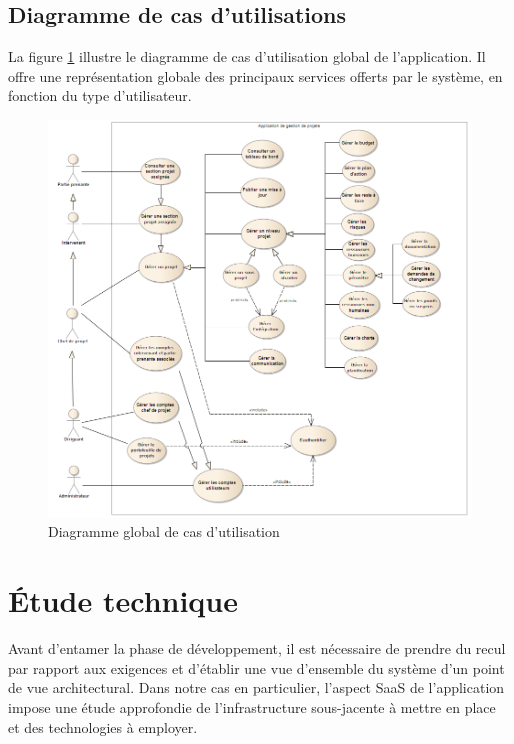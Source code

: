 \begin{spacing}{1.5}
\subsection{Diagramme de cas d'utilisations}
La figure \ref{fig:useCasesDiag} illustre le diagramme de cas d'utilisation global de l'application. Il offre une représentation globale des principaux services offerts par le système, en fonction du type d'utilisateur.

\begin{figure}[H]
\centering
\includegraphics[width=1\linewidth]{useCasesDiag.png}
\caption{Diagramme global de cas d'utilisation}
\label{fig:useCasesDiag}
\end{figure}


\section{Étude technique}
Avant d'entamer la phase de développement, il est nécessaire de prendre du recul par rapport aux exigences et d'établir une vue d'ensemble du système d'un point de vue architectural. Dans notre cas en particulier, l'aspect SaaS de l'application impose une étude approfondie de l'infrastructure sous-jacente à mettre en place et des technologies à employer.


\end{spacing}
